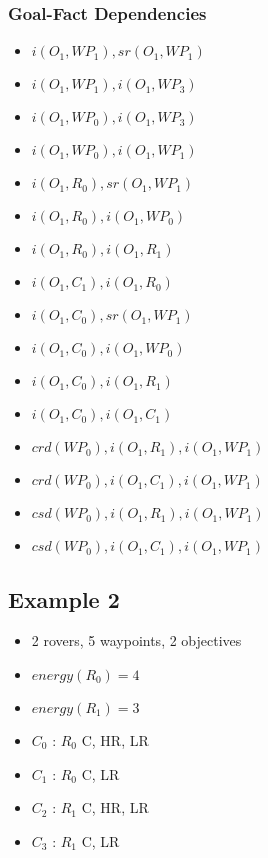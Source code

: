\subsubsection*{Goal-Fact Dependencies}
\begin{itemize}
	\item $i(O_1,WP_1),sr(O_1,WP_1)$
	\item $i(O_1,WP_1),i(O_1,WP_3)$
	\item $i(O_1,WP_0),i(O_1,WP_3)$
	\item $i(O_1,WP_0),i(O_1,WP_1)$
	\item $i(O_1,R_0),sr(O_1,WP_1)$
	\item $i(O_1,R_0),i(O_1,WP_0)$
	\item $i(O_1,R_0),i(O_1,R_1)$
	\item $i(O_1,C_1),i(O_1,R_0)$
	\item $i(O_1,C_0),sr(O_1,WP_1)$
	\item $i(O_1,C_0),i(O_1,WP_0)$
	\item $i(O_1,C_0),i(O_1,R_1)$
	\item $i(O_1,C_0),i(O_1,C_1)$
	\item $crd(WP_0),i(O_1,R_1),i(O_1,WP_1)$
	\item $crd(WP_0),i(O_1,C_1),i(O_1,WP_1)$
	\item $csd(WP_0),i(O_1,R_1),i(O_1,WP_1)$
	\item $csd(WP_0),i(O_1,C_1),i(O_1,WP_1)$
\end{itemize}





\subsection*{Example 2}

\begin{itemize}
	\item 2 rovers, 5 waypoints, 2 objectives
	\item $energy(R_0) = 4$
	\item $energy(R_1) = 3$
	\item $C_0$ : $R_0$ C, HR, LR
	\item $C_1$ : $R_0$ C, LR
	\item $C_2$ : $R_1$ C, HR, LR
	\item $C_3$ : $R_1$ C, LR
\end{itemize}

